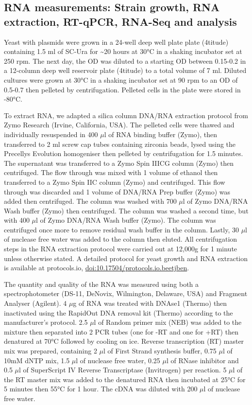\documentclass[../main.tex]{subfiles}
\begin{document}
\subsection{RNA measurements: Strain growth, RNA extraction, RT-qPCR, RNA-Seq and analysis}

Yeast with plasmids were grown in a 24-well deep well plate plate (4titude) containing 1.5 ml of SC-Ura for \textasciitilde20 hours at 30°C in a shaking incubator set at 250 rpm.
The next day, the OD was diluted to a starting OD between 0.15-0.2 in a 12-column deep well reservoir plate (4titude) to a total volume of 7 ml.
Diluted cultures were grown at 30°C in a shaking incubator set at 90 rpm to an OD of 0.5-0.7 then pelleted by centrifugation.
Pelleted cells in the plate were stored in -80°C.

To extract RNA, we adapted a silica column DNA/RNA extraction protocol from Zymo Research (Irvine, California, USA).
The pelleted cells were thawed and individually resuspended in 400 \(\mu\)l of RNA binding buffer (Zymo), then transferred to 2 ml screw cap tubes containing zirconia beads, lysed using the Precellys Evolution homogeniser then pelleted by centrifugation for 1.5 minutes.
The supernatant was transferred to a Zymo Spin IIICG column (Zymo) then centrifuged. The flow through was mixed with 1 volume of ethanol then transferred to a Zymo Spin IIC column (Zymo) and centrifuged.
This flow through was discarded and 1 volume of DNA/RNA Prep buffer (Zymo) was added then centrifuged.
The column was washed with 700 \(\mu\)l of Zymo DNA/RNA Wash buffer (Zymo) then centrifuged.
The column was washed a second time, but with 400 \(\mu\)l of Zymo DNA/RNA Wash buffer (Zymo).
The column was centrifuged once more to remove residual wash buffer in the column. Lastly, 30 \(\mu\)l of nuclease free water was added to the column then eluted.
All centrifugation steps in the RNA extraction protocol were carried out at 12,000g for 1 minute unless otherwise stated.
A detailed protocol for yeast growth and RNA extraction is available at protocols.io, \href{https://dx.doi.org/10.17504/protocols.io.beetjben}{doi:10.17504/protocols.io.beetjben}.

The quantity and quality of the RNA was measured using both a spectrophotometer (DS-11, DeNovix, Wilmington, Delaware, USA) and Fragment Analyser (Agilent).
4 \(\mu\)g of RNA was treated with DNAse1 (Thermo) then inactivated using the RapidOut DNA removal kit (Thermo) according to the manufacturer's protocol.
2.5 \(\mu\)l of Random primer mix (NEB) was added to the mixture then separated into 2 PCR tubes (one for -RT and one for +RT) then denatured at 70°C followed by cooling on ice.
Reverse transcription (RT) master mix was prepared, containing 2 \(\mu\)l of First Strand synthesis buffer, 0.75 \(\mu\)l of 10mM dNTP mix, 1.5 \(\mu\)l of nuclease free water, 0.25 \(\mu\)l of RNase inhibitor and 0.5 \(\mu\)l of SuperScript IV Reverse Transcriptase (Invitrogen) per reaction.
5 \(\mu\)l of the RT master mix was added to the denatured RNA then incubated at 25°C for 5 minutes then 55°C for 1 hour. The cDNA was diluted with 200 \(\mu\)l of nuclease free water.
\end{document}
